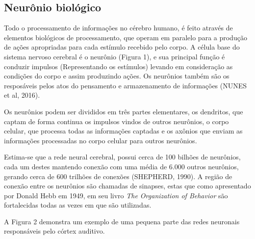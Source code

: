 \subsection{Neurônio biológico}


Todo o processamento de informações no cérebro humano, é feito através de elementos biológicos de processamento, que operam em paralelo para a produção de ações apropriadas para cada estímulo recebido pelo corpo. A célula base do sistema nervoso cerebral é o neurônio (Figura 1), e sua principal função é conduzir impulsos (Representando os estímulos) levando em consideração as condições do corpo e assim produzindo ações. Os neurônios também são os resposáveis pelos atos do pensamento e armazenamento de informações (NUNES et al, 2016).

Os neurônios podem ser divididos em três partes elementares, os dendritos, que captam de forma continua os impulsos vindos de outros neurônios, o corpo celular, que processa todas as informações captadas e os axônios que enviam as informações processadas no corpo celular para outros neurônios.


Estima-se que a rede neural cerebral, possui cerca de 100 bilhões de neurônios, cada um destes mantendo conexão com uma média de 6.000 outros neurônios, gerando cerca de 600 trilhões de conexões (SHEPHERD, 1990). A região de conexão entre os neurônios são chamadas de sinapses, estas que como apresentado por Donald Hebb em 1949, em seu livro \textit{The Organization of Behavior} são fortalecidas todas as vezes em que são utilizadas.


A Figura 2 demonstra um exemplo de uma pequena parte das redes neuronais responsáveis pelo córtex auditivo.

